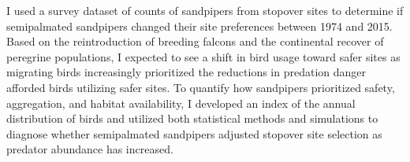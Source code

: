 I used a survey dataset of counts of sandpipers from stopover sites to determine if semipalmated sandpipers changed their site preferences between 1974 and 2015. Based on the reintroduction of breeding falcons and the continental recover of peregrine populations, I expected to see a shift in bird usage toward safer sites as migrating birds increasingly prioritized the reductions in predation danger afforded birds utilizing safer sites. To quantify how sandpipers prioritized safety, aggregation, and habitat availability, I developed an index of the annual distribution of birds and utilized both statistical methods and simulations to diagnose whether semipalmated sandpipers adjusted stopover site selection as predator abundance has increased.